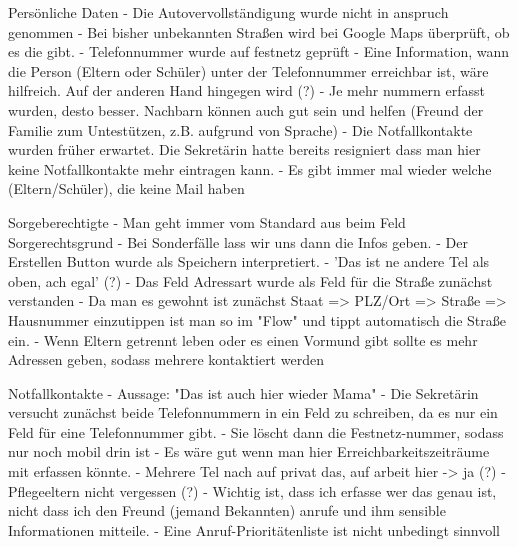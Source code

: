 Persönliche Daten
- Die Autovervollständigung wurde nicht in anspruch genommen
- Bei bisher unbekannten Straßen wird bei Google Maps überprüft, ob es die gibt.
- Telefonnummer wurde auf festnetz geprüft
- Eine Information, wann die Person (Eltern oder Schüler) unter der Telefonnummer erreichbar ist, wäre hilfreich. Auf der anderen Hand hingegen wird (?)
- Je mehr nummern erfasst wurden, desto besser. Nachbarn können auch gut sein und helfen (Freund der Familie zum Untestützen, z.B. aufgrund von Sprache)
- Die Notfallkontakte wurden früher erwartet. Die Sekretärin hatte bereits resigniert dass man hier keine Notfallkontakte mehr eintragen kann.
- Es gibt immer mal wieder welche (Eltern/Schüler), die keine Mail haben







Sorgeberechtigte		
- Man geht immer vom Standard aus beim Feld Sorgerechtsgrund
- Bei Sonderfälle lass wir uns dann die Infos geben.
- Der Erstellen Button wurde als Speichern interpretiert.
- 'Das ist ne andere Tel als oben, ach egal' (?)
- Das Feld Adressart wurde als Feld für die Straße zunächst verstanden
 - Da man es gewohnt ist zunächst Staat => PLZ/Ort => Straße => Hausnummer einzutippen ist man so im "Flow" und tippt automatisch die Straße ein.
- Wenn Eltern getrennt leben oder es einen Vormund gibt sollte es mehr Adressen geben, sodass mehrere kontaktiert werden




























Notfallkontakte
- Aussage: "Das ist auch hier wieder Mama"
- Die Sekretärin versucht zunächst beide Telefonnummern in ein Feld zu schreiben, da es nur ein Feld für eine Telefonnummer gibt.
 - Sie löscht dann die Festnetz-nummer, sodass nur noch mobil drin ist
 - Es wäre gut wenn man hier Erreichbarkeitszeiträume mit erfassen könnte.
- Mehrere Tel nach auf privat das, auf arbeit hier -> ja (?)
- Pflegeeltern nicht vergessen (?)
- Wichtig ist, dass ich erfasse wer das genau ist, nicht dass ich den Freund (jemand Bekannten) anrufe und ihm sensible Informationen mitteile.
- Eine Anruf-Prioritätenliste ist nicht unbedingt sinnvoll








